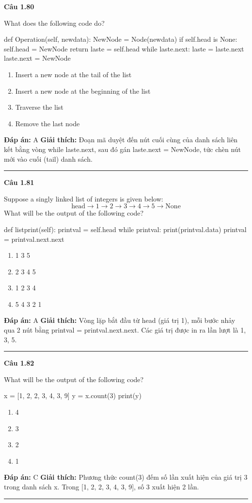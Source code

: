 \documentclass[11pt,a4paper]{article}
\newenvironment{question}[1]{%
  \par\vspace{1em}\noindent\textbf{\large Câu #1}\par\vspace{0.4em}
}{%
  \par\vspace{1em}\hrule\vspace{0.6em}
}
\newenvironment{choices}{%
  \begin{enumerate}[label=\textbf{\Alph*.},leftmargin=2.2em,itemsep=2pt,topsep=3pt]
}{%
  \end{enumerate}
}
\newcommand{\choice}{\item}
\newenvironment{codebox}{%
  \begin{tcolorbox}[colback=gray!8!white,colframe=gray!50!black,arc=1.5mm,boxrule=0.6pt,left=3mm,right=3mm,top=2.5mm,bottom=2.5mm]
  \ttfamily\small
}{%
  \end{tcolorbox}
}
\begin{document}
\begin{question}{1.80}
What does the following code do?
\begin{codebox}
def Operation(self, newdata):
    NewNode = Node(newdata)
    if self.head is None:
        self.head = NewNode
        return
    laste = self.head
    while laste.next:
        laste = laste.next
    laste.next = NewNode
\end{codebox}
\begin{choices}
\choice Insert a new node at the tail of the list
\choice Insert a new node at the beginning of the list
\choice Traverse the list
\choice Remove the last node
\end{choices}
\textbf{Đáp án:} A
\textbf{Giải thích:} Đoạn mã duyệt đến nút cuối cùng của danh sách liên kết bằng vòng while laste.next, sau đó gán laste.next = NewNode, tức chèn nút mới vào cuối (tail) danh sách.
\end{question}

\begin{question}{1.81}
Suppose a singly linked list of integers is given below:
$$\text{head} \to 1 \to 2 \to 3 \to 4 \to 5 \to \text{None}$$
What will be the output of the following code?
\begin{codebox}
def listprint(self):
    printval = self.head
    while printval:
        print(printval.data)
        printval = printval.next.next
\end{codebox}
\begin{choices}
\choice 1 3 5
\choice 2 3 4 5
\choice 1 2 3 4
\choice 5 4 3 2 1
\end{choices}
\textbf{Đáp án:} A
\textbf{Giải thích:} Vòng lặp bắt đầu từ head (giá trị 1), mỗi bước nhảy qua 2 nút bằng printval = printval.next.next. Các giá trị được in ra lần lượt là 1, 3, 5.
\end{question}

\begin{question}{1.82}
What will be the output of the following code?
\begin{codebox}
x = [1, 2, 2, 3, 4, 3, 9]
y = x.count(3)
print(y)
\end{codebox}
\begin{choices}
\choice 4
\choice 3
\choice 2
\choice 1
\end{choices}
\textbf{Đáp án:} C
\textbf{Giải thích:} Phương thức count(3) đếm số lần xuất hiện của giá trị 3 trong danh sách x. Trong [1, 2, 2, 3, 4, 3, 9], số 3 xuất hiện 2 lần.
\end{question}
\end{document}
